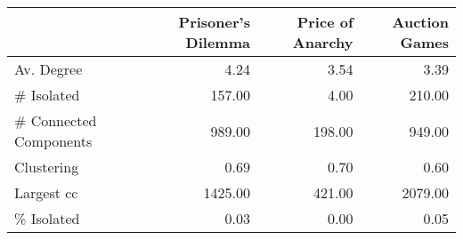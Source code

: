 \begin{tabular}{lrrr}
\toprule
{} &  Prisoner's Dilemma &  Price of Anarchy &  Auction Games \\
\midrule
Av. Degree             &                4.24 &              3.54 &           3.39 \\
\# Isolated             &              157.00 &              4.00 &         210.00 \\
\# Connected Components &              989.00 &            198.00 &         949.00 \\
Clustering             &                0.69 &              0.70 &           0.60 \\
Largest cc             &             1425.00 &            421.00 &        2079.00 \\
\% Isolated             &                0.03 &              0.00 &           0.05 \\
\bottomrule
\end{tabular}
